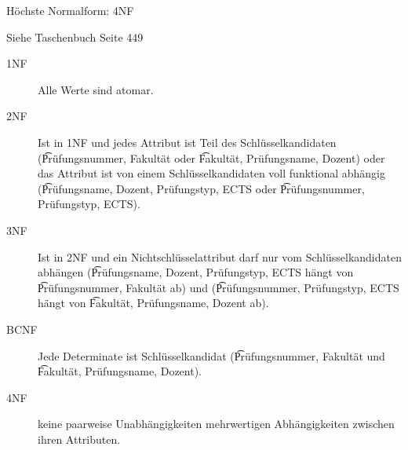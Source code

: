 \documentclass{bschlangaul-aufgabe}
\begin{document}
\begin{liAntwort}

Höchste Normalform: 4NF

Siehe Taschenbuch Seite 449

\begin{description}
\item[1NF]

Alle Werte sind atomar.

\item[2NF]

Ist in 1NF und jedes Attribut ist Teil des Schlüsselkandidaten
(\t{Prüfungsnummer, Fakultät} oder \t{Fakultät, Prüfungsname, Dozent})
oder das Attribut ist von einem Schlüsselkandidaten voll funktional
abhängig (\t{Prüfungsname, Dozent, Prüfungstyp, ECTS} oder
\t{Prüfungsnummer, Prüfungstyp, ECTS}).

\item[3NF]

Ist in 2NF und ein Nichtschlüsselattribut darf nur vom
Schlüsselkandidaten abhängen (\t{Prüfungsname, Dozent, Prüfungstyp,
ECTS} hängt von \t{Prüfungsnummer, Fakultät} ab) und (\t{Prüfungsnummer,
Prüfungstyp, ECTS} hängt von \t{Fakultät, Prüfungsname, Dozent} ab).

\item[BCNF]

Jede Determinate ist Schlüsselkandidat (\t{Prüfungsnummer, Fakultät} und
\t{Fakultät, Prüfungsname, Dozent}).

\item[4NF]

keine paarweise Unabhängigkeiten mehrwertigen Abhängigkeiten zwischen
ihren Attributen.
\end{description}
\end{liAntwort}
\end{document}
